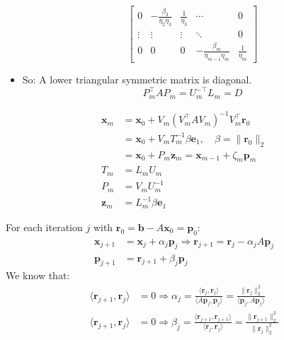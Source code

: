 \begin{itemize}
\[\begin{bmatrix}
                  0                              & -\frac{\beta_3}{\eta_2 \eta_3} & \frac{1}{\eta_3} & \cdots                             & 0                \\
                  \vdots                         & \vdots                         & \vdots           & \ddots                             & 0                \\
                  0                              & 0                              & 0                & -\frac{\beta_m}{\eta_{m-1} \eta_m} & \frac{1}{\eta_m}
              \end{bmatrix}
          \]
    \item So: A lower triangular symmetric matrix is diagonal.
          \[
              P_m^\top A P_m = U_m^{-\top} L_m = D
          \]
\end{itemize}

\begin{align*}
    \mathbf{x}_m & = \mathbf{x}_0 + V_m \left(V_m^\top A V_m\right)^{-1} V_m^\top \mathbf{r}_0        \\
                 & = \mathbf{x}_0 + V_m T_m^{-1} \beta \mathbf{e}_1, \quad \beta = \|\mathbf{r}_0\|_2 \\
                 & = \mathbf{x}_0 + P_m \mathbf{z}_m = \mathbf{x}_{m-1} + \zeta_m \mathbf{p}_m        \\
    T_m          & = L_m U_m                                                                          \\
    P_m          & = V_m U_m^{-1}                                                                     \\
    \mathbf{z}_m & = L_m^{-1} \beta \mathbf{e}_1
\end{align*}

For each iteration $j$ with $\mathbf{r}_0 = \mathbf{b} - A\mathbf{x}_0 = \mathbf{p}_0$:
\begin{align*}
    \mathbf{x}_{j+1} & = \mathbf{x}_j + \alpha_j \mathbf{p}_j \Rightarrow \mathbf{r}_{j+1} = \mathbf{r}_j - \alpha_j A \mathbf{p}_j \\
    \mathbf{p}_{j+1} & = \mathbf{r}_{j+1} + \beta_j \mathbf{p}_j
\end{align*}
We know that:
\begin{align*}
    \langle \mathbf{r}_{j+1}, \mathbf{r}_j \rangle & = 0 \Rightarrow \alpha_j = \frac{\langle \mathbf{r}_j, \mathbf{r}_j \rangle}{\langle A \mathbf{p}_j, \mathbf{p}_j \rangle} = \frac{\|\mathbf{r}_j\|_2^2}{\langle \mathbf{p}_j, A \mathbf{p}_j \rangle} \\
    \langle \mathbf{r}_{j+1}, \mathbf{r}_j \rangle & = 0 \Rightarrow \beta_j = \frac{\langle \mathbf{r}_{j+1}, \mathbf{r}_{j+1} \rangle}{\langle \mathbf{r}_j, \mathbf{r}_j \rangle} = \frac{\|\mathbf{r}_{j+1}\|_2^2}{\|\mathbf{r}_j\|_2^2}
\end{align*}

